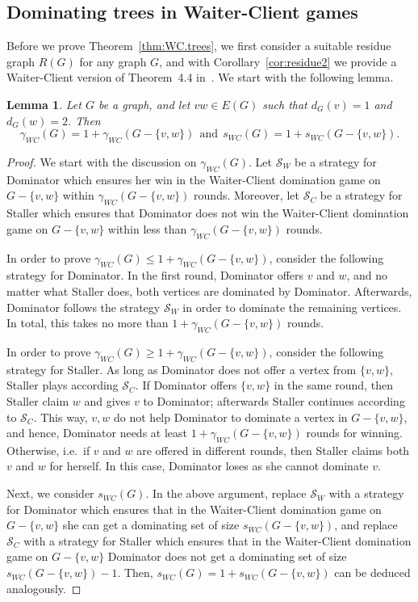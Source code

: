 \documentclass[reqno, 12pt]{amsart}
\numberwithin{equation}{section}
\numberwithin{figure}{section}
\newtheorem{lemma}[theorem]{Lemma}
\begin{document}
\subsection{Dominating trees in Waiter-Client games}

Before we prove Theorem~\ref{thm:WC.trees},
we first consider a suitable residue graph $R(G)$ 
for any graph $G$,
and with
Corollary~\ref{cor:residue2} we provide
a Waiter-Client version of Theorem~4.4 in~\cite{gledel2019maker}.
We start with the following lemma.

\begin{lemma}\label{lem:residue1}
Let $G$ be a graph, and let $vw\in E(G)$ such that
$d_G(v)=1$ and $d_G(w)=2$. Then
$$
\gamma_{WC}(G) = 1 + \gamma_{WC}(G-\{v,w\})
~~\text{and}~~
s_{WC}(G) = 1 + s_{WC}(G-\{v,w\}).
$$
\end{lemma}

\begin{proof}
We start with the discussion on $\gamma_{WC}(G)$.
Let $\mathcal{S}_W$ be a strategy for Dominator
which ensures her win in the Waiter-Client domination game 
on $G-\{v,w\}$ within $\gamma_{WC}(G-\{v,w\})$ rounds.
Moreover, let $\mathcal{S}_C$ be a strategy for Staller
which ensures that Dominator does not win the Waiter-Client domination game on $G-\{v,w\}$ within less than
$\gamma_{WC}(G-\{v,w\})$ rounds.

In order to prove     
$\gamma_{WC}(G) \leq 1 + \gamma_{WC}(G-\{v,w\})$,
consider the following strategy for Dominator.
In the first round, Dominator offers $v$ and $w$,
and no matter what Staller does, both vertices are dominated by Dominator. Afterwards, Dominator follows the strategy $\mathcal{S}_W$
in order to dominate the remaining vertices.
In total, this takes no more than $1 + \gamma_{WC}(G-\{v,w\})$ rounds.

In order to prove 
$\gamma_{WC}(G) \geq 1 + \gamma_{WC}(G-\{v,w\})$,
consider the following strategy for Staller.
As long as Dominator does not offer a vertex from $\{v,w\}$,
Staller plays according $\mathcal{S}_C$. 
If Dominator offers $\{v,w\}$ in the same round,
then Staller claim $w$ and gives $v$ to Dominator;
afterwards Staller continues according to $\mathcal{S}_C$.
This way, $v,w$ do not help Dominator to dominate a vertex in $G-\{v,w\}$, and hence, Dominator needs at least 
$1 + \gamma_{WC}(G-\{v,w\})$ rounds for winning.
Otherwise, i.e.~if $v$ and $w$ are offered in different rounds,
then Staller claims both $v$ and $w$ for herself.
In this case, Dominator loses as she cannot dominate $v$.

\smallskip

Next, we consider $s_{WC}(G)$.
In the above argument, replace $\mathcal{S}_W$ with a strategy for Dominator
which ensures that in the Waiter-Client domination game 
on $G-\{v,w\}$ she can get a dominating set of size $s_{WC}(G-\{v,w\})$,
and replace $\mathcal{S}_C$ with a strategy for Staller
which ensures that in the Waiter-Client domination game on $G-\{v,w\}$ Dominator does not get a dominating set of size $s_{WC}(G-\{v,w\}) - 1$.
Then, $s_{WC}(G) = 1 + s_{WC}(G-\{v,w\})$
can be deduced analogously.
\end{proof}
\end{document}
